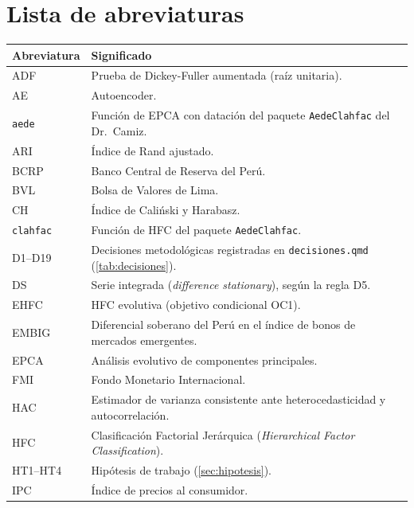 \chapter*{Lista de abreviaturas}
{\small
\begin{longtable}{@{}p{}p{}@{}}
\toprule
Abreviatura & Significado \\
\midrule
\endhead
\bottomrule
\endfoot
ADF & Prueba de Dickey-Fuller aumentada (raíz unitaria). \\
AE & Autoencoder. \\
\texttt{aede} & Función de EPCA con datación del paquete \texttt{AedeClahfac} del Dr.~Camiz. \\
ARI & Índice de Rand ajustado. \\
BCRP & Banco Central de Reserva del Perú. \\
BVL & Bolsa de Valores de Lima. \\
CH & Índice de Caliński y Harabasz. \\
\texttt{clahfac} & Función de HFC del paquete \texttt{AedeClahfac}. \\
D1--D19 & Decisiones metodológicas registradas en \texttt{decisiones.qmd} (\cref{tab:decisiones}). \\
DS & Serie integrada (\emph{difference stationary}), según la regla D5. \\
EHFC & HFC evolutiva (objetivo condicional OC1). \\
EMBIG & Diferencial soberano del Perú en el índice de bonos de mercados emergentes. \\
EPCA & Análisis evolutivo de componentes principales. \\
FMI & Fondo Monetario Internacional. \\
HAC & Estimador de varianza consistente ante heterocedasticidad y autocorrelación. \\
HFC & Clasificación Factorial Jerárquica (\emph{Hierarchical Factor Classification}). \\
HT1--HT4 & Hipótesis de trabajo (\cref{sec:hipotesis}). \\
IPC & Índice de precios al consumidor. \\

\end{longtable}}
